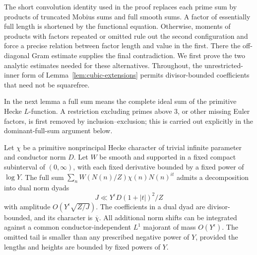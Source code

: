 The short convolution identity used in the proof replaces each prime
sum by products of truncated Mobius sums and full smooth sums.
A factor of essentially full length is shortened by the functional
equation. Otherwise, moments of products with factors repeated or
omitted rule out the second configuration and force a precise relation
between factor length and value in the first. There the off-diagonal
Gram estimate supplies the final contradiction. We first prove the two
analytic estimates needed for these alternatives. Throughout, the
unrestricted-inner form of Lemma~\ref{lem:cubic-extensions} permits
divisor-bounded coefficients that need not be squarefree.

In the next lemma a full sum means the complete ideal sum of the
primitive Hecke $L$-function. A restriction excluding primes above $3$,
or other missing Euler factors, is first removed by inclusion--exclusion;
this is carried out explicitly in the dominant-full-sum argument below.

\begin{lemma}
\label{lem:smooth-character-duality}
Let $\chi$ be a primitive nonprincipal Hecke character of trivial
infinite parameter and conductor norm $D$. Let $W$ be smooth and supported in a
fixed compact subinterval of $(0,\infty)$, with each fixed derivative
bounded by a fixed power of $\log Y$. The full sum
$\sum_n W(N(n)/Z)\chi(n)N(n)^{it}$ admits a decomposition into dual
norm dyads
\[
 J\ll Y^\epsilon D(1+|t|)^2/Z
\]
with amplitude $O(Y^\epsilon\sqrt{Z/J})$.  The coefficients in a dual
dyad are divisor-bounded, and its character is $\overline\chi$.
All additional norm shifts can be integrated against a common
conductor-independent $L^1$ majorant of mass $O(Y^\epsilon)$.
The omitted tail is smaller than any prescribed negative power of $Y$,
provided the lengths and heights are bounded by fixed powers of $Y$.
\end{lemma}

